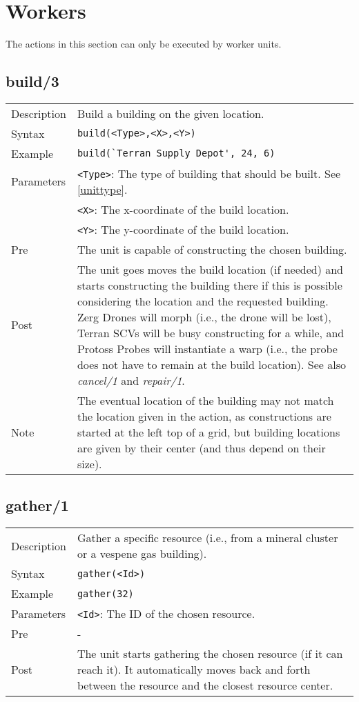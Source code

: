 \pagebreak

\section{Workers}
The actions in this section can only be executed by worker units.

\subsection{build/3}
\begin{tabularx}{\textwidth}{lX}
 Description & Build a building on the given location. \\
 Syntax & \verb|build(<Type>,<X>,<Y>)| \\
 Example & \verb|build(`Terran Supply Depot', 24, 6)| \\
 Parameters & \verb|<Type>|: The type of building that should be built. See \ref{unittype}. \\
            & \verb|<X>|: The x-coordinate of the build location. \\
            & \verb|<Y>|: The y-coordinate of the build location. \\
 Pre & The unit is capable of constructing the chosen building. \\
 Post & The unit goes moves the build location (if needed) and starts constructing the building there if this is possible considering the location and the requested building. Zerg Drones will morph (i.e., the drone will be lost), Terran SCVs will be busy constructing for a while, and Protoss Probes will instantiate a warp (i.e., the probe does not have to remain at the build location). See also \textit{cancel/1} and \textit{repair/1}. \\
 Note & The eventual location of the building may not match the location given in the action, as constructions are started at the left top of a grid, but building locations are given by their center (and thus depend on their size).
\end{tabularx}

\subsection{gather/1}
\begin{tabularx}{\textwidth}{lX}
 Description & Gather a specific resource (i.e., from a mineral cluster or a vespene gas building). \\
 Syntax & \verb|gather(<Id>)| \\
 Example & \verb|gather(32)| \\
 Parameters & \verb|<Id>|: The ID of the chosen resource. \\
 Pre & - \\
 Post & The unit starts gathering the chosen resource (if it can reach it). It automatically moves back and forth between the resource and the closest resource center.
\end{tabularx}


